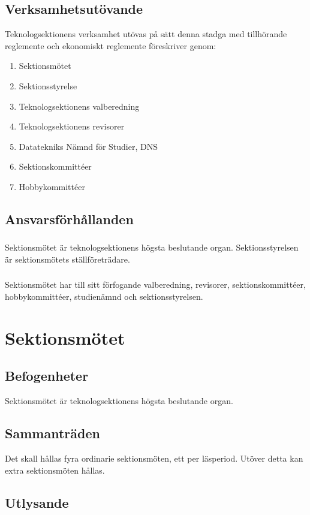 \documentclass[a4paper]{dtek}
\begin{document}
\subsection{Verksamhetsutövande}
Teknologsektionens verksamhet utövas på sätt denna stadga med tillhörande reglemente och ekonomiskt reglemente föreskriver genom:
\begin{enumerate}
\item Sektionsmötet
\item Sektionsstyrelse
\item Teknologsektionens valberedning
\item Teknologsektionens revisorer
\item Datatekniks Nämnd för Studier, DNS
\item Sektionskommittéer
\item Hobbykommittéer
\end{enumerate}
\subsection{Ansvarsförhållanden}
\subsubsection{}
Sektionsmötet är teknologsektionens högsta beslutande organ. Sektionsstyrelsen är sektionsmötets ställföreträdare.
\subsubsection{}
Sektionsmötet har till sitt förfogande valberedning, revisorer, sektionskommittéer, hobbykommittéer, studienämnd och sektionsstyrelsen.
\newpage

\section{Sektionsmötet}
\subsection{Befogenheter}
Sektionsmötet är teknologsektionens högsta beslutande organ.
\subsection{Sammanträden}
Det skall hållas fyra ordinarie sektionsmöten, ett per läsperiod. Utöver detta kan extra sektionsmöten hållas.
\subsection{Utlysande}
\end{document}
